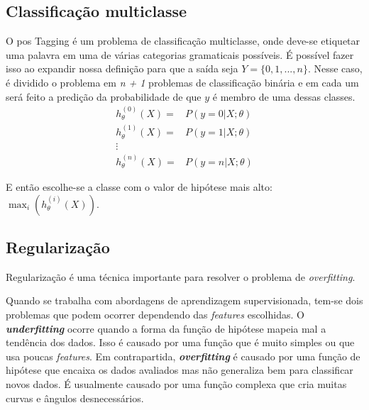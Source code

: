 \subsection{Classificação multiclasse}

O \ac{pos} Tagging é um problema de classificação multiclasse, onde deve-se etiquetar uma palavra em uma de várias categorias gramaticais possíveis. É possível fazer isso ao expandir nossa definição para que a saída seja $Y = \{0, 1, ..., n\}$. Nesse caso, é dividido o problema em \textit{n + 1} problemas de classificação binária e em cada um será feito a predição da probabilidade de que $y$ é membro de uma dessas classes.
\begin{align}
h_{\theta}^{(0)}(X) =&  P(y=0 | X ; \theta) \nonumber \\
h_{\theta}^{(1)}(X) =&  P(y=1 | X ; \theta) \nonumber \\
\vdots & \nonumber \\
h_{\theta}^{(n)}(X) =&  P(y=n | X ; \theta) \nonumber
\end{align}

E então escolhe-se a classe com o valor de hipótese mais alto: $ \max_i(h_{\theta}^{(i)}(X)) $.


\subsection{Regularização}\label{subsec:regularizacao}

Regularização é uma técnica importante para resolver o problema de \textit{overfitting}.

Quando se trabalha com abordagens de aprendizagem supervisionada, tem-se dois problemas que podem ocorrer dependendo das \textit{features} escolhidas. O \textbf{\textit{underfitting}} ocorre quando a forma da função de hipótese mapeia mal a tendência dos dados. Isso é causado por uma função que é muito simples ou que usa poucas \textit{features}. Em contrapartida, \textbf{\textit{overfitting}} é causado por uma função de hipótese que encaixa os dados avaliados mas não generaliza bem para classificar novos dados. É usualmente causado por uma função complexa que cria muitas curvas e ângulos desnecessários.


